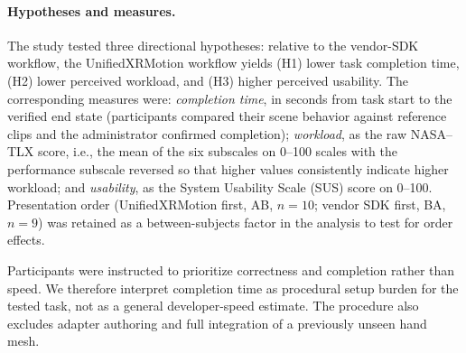 \documentclass[runningheads]{llncs}
\begin{document}
\paragraph{Hypotheses and measures.}
	The study tested three directional hypotheses: relative to the vendor-SDK workflow, the UnifiedXRMotion workflow yields (H1) lower task completion time, (H2) lower perceived workload, and (H3) higher perceived usability.
	The corresponding measures were: \emph{completion time}, in seconds from task start to the verified end state (participants compared their scene behavior against reference clips and the administrator confirmed completion); \emph{workload}, as the raw NASA--TLX score, i.e., the mean of the six subscales on 0--100 scales with the performance subscale reversed so that higher values consistently indicate higher workload; and \emph{usability}, as the System Usability Scale (SUS) score on 0--100.
	Presentation order (UnifiedXRMotion first, AB, $n=10$; vendor SDK first, BA, $n=9$) was retained as a between-subjects factor in the analysis to test for order effects.

Participants were instructed to prioritize correctness and completion rather than speed. We therefore interpret completion time as procedural setup burden for the tested task, not as a general developer-speed estimate. The procedure also excludes adapter authoring and full integration of a previously unseen hand mesh.
\end{document}
